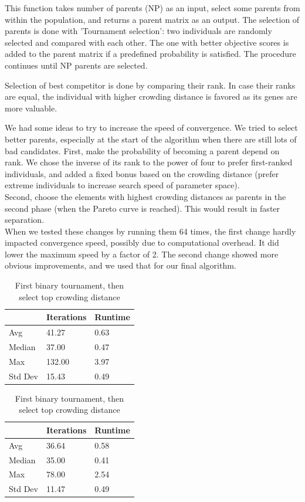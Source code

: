 This function takes number of parents (NP) as an input, select some parents from within the population, and returns a parent matrix as an output. The selection of parents is done with 'Tournament selection': two individuals are randomly selected and compared with each other. The one with better objective scores is added to the parent matrix if a predefined probability is satisfied. The procedure continues until NP parents are selected. 

Selection of best competitor is done by comparing their rank. In case their ranks are equal, the individual with higher crowding distance is favored as its genes are more valuable.

We had some ideas to try to increase the speed of convergence. We tried to select better parents, especially at the start of the algorithm when there are still lots of bad candidates.
First, make the probability of becoming a parent depend on rank. We chose the inverse of its rank to the power of four to prefer first-ranked individuals, and added a fixed bonus based on the crowding distance (prefer extreme individuals to increase search speed of parameter space).\\
Second, choose the elements with highest crowding distances as parents in the second phase (when the Pareto curve is reached). This would result in faster separation.\\
When we tested these changes by running them 64 times, the first change hardly impacted convergence speed, possibly due to computational overhead. It did lower the maximum speed by a factor of 2.
The second change showed more obvious improvements, and we used that for our final algorithm.
\begin{table}[!htb]
	\caption{Summarizing table}
	\begin{minipage}{.5\linewidth}
		\caption{Simple binary tournament}
		\centering
		\begin{tabular}{ | l | l | l | }
			\hline
		 	 & Iterations & Runtime \\
		 	 \hline
			Avg &41.27	 &  0.63  \\
			Median &37.00 &  0.47\\
			Max &132.00	& 3.97 \\
			Std Dev & 15.43	&  0.49 \\
			\hline
		\end{tabular}
	\end{minipage}%
	\begin{minipage}{.5\linewidth}
		\centering
		\caption{First binary tournament, then select top crowding distance}
		\begin{tabular}{ |l| l | l |}
			\hline
			& Iterations & Runtime \\
			\hline
			Avg    &      36.64   &   0.58 \\
			Median      &     35.00      &      0.41    \\
			Max		&	 78.00      &     2.54  \\
			Std Dev  &   11.47   &   0.49   \\
			\hline
		\end{tabular}
	\end{minipage} 
\end{table}




